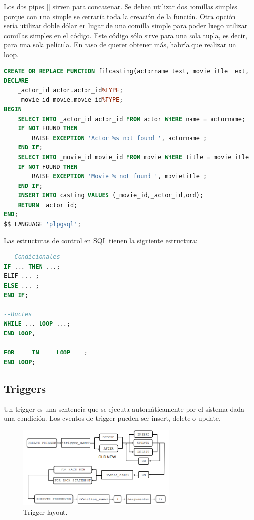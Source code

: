 Los dos pipes || sirven para concatenar. Se deben utilizar dos comillas simples porque con una simple se cerraría toda la creación de la función. Otra opción sería utilizar doble dólar en lugar de una comilla simple para poder luego utilizar comillas simples en el código. Este código sólo sirve para una sola tupla, es decir, para una sola película. En caso de querer obtener más, habría que realizar un loop. 
\begin{lstlisting}[language=SQL]
CREATE OR REPLACE FUNCTION filcasting(actorname text, movietitle text, ord int) RETURNS int AS $$
DECLARE
	_actor_id actor.actor_id%TYPE;
	_movie_id movie.movie_id%TYPE;
BEGIN
	SELECT INTO _actor_id actor_id FROM actor WHERE name = actorname;
	IF NOT FOUND THEN
		RAISE EXCEPTION 'Actor %s not found ', actorname ;
	END IF;
	SELECT INTO _movie_id movie_id FROM movie WHERE title = movietitle;
	IF NOT FOUND THEN
		RAISE EXCEPTION 'Movie % not found ', movietitle ;
	END IF;
	INSERT INTO casting VALUES (_movie_id,_actor_id,ord);
	RETURN _actor_id;
END;
$$ LANGUAGE 'plpgsql';
\end{lstlisting}

Las estructuras de control en SQL tienen la siguiente estructura:
\begin{lstlisting}[language=SQL]
-- Condicionales
IF ... THEN ...;
ELIF ... ;
ELSE ... ;
END IF;

--Bucles
WHILE ... LOOP ...;
END LOOP;

FOR ... IN ... LOOP ...;
END LOOP;
\end{lstlisting}

\subsection{Triggers}
Un trigger es una sentencia que se ejecuta automáticamente por el sistema dada una condición. Los eventos de trigger pueden ser insert, delete o update. 
\begin{figure}[htbp]
\centering
\includegraphics[width = 0.7\textwidth]{figs/trigger.png}
\caption{Trigger layout.}
\end{figure}

